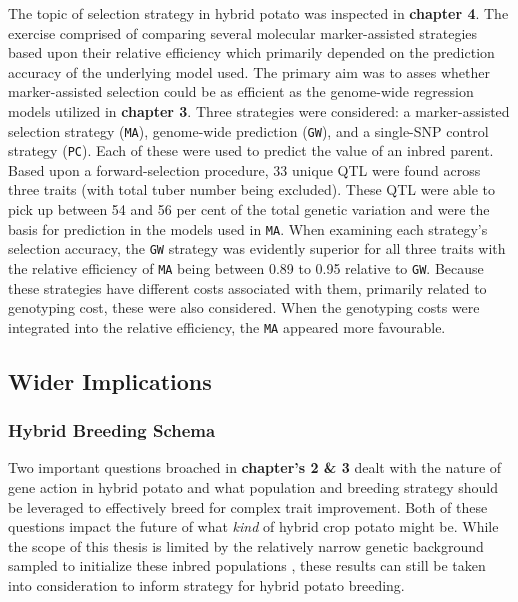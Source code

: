 \documentclass[
]{article}
\begin{document}
The topic of selection strategy in hybrid potato was inspected in
\textbf{chapter 4}. The exercise comprised of comparing several
molecular marker-assisted strategies based upon their relative
efficiency which primarily depended on the prediction accuracy of the
underlying model used. The primary aim was to asses whether
marker-assisted selection could be as efficient as the genome-wide
regression models utilized in \textbf{chapter 3}. Three strategies were
considered: a marker-assisted selection strategy (\texttt{MA}),
genome-wide prediction (\texttt{GW}), and a single-SNP control strategy
(\texttt{PC}). Each of these were used to predict the value of an inbred
parent. Based upon a forward-selection procedure, 33 unique QTL were
found across three traits (with total tuber number being excluded).
These QTL were able to pick up between 54 and 56 per cent of the total
genetic variation and were the basis for prediction in the models used
in \texttt{MA}. When examining each strategy's selection accuracy, the
\texttt{GW} strategy was evidently superior for all three traits with
the relative efficiency of \texttt{MA} being between 0.89 to 0.95
relative to \texttt{GW}. Because these strategies have different costs
associated with them, primarily related to genotyping cost, these were
also considered. When the genotyping costs were integrated into the
relative efficiency, the \texttt{MA} appeared more favourable.

\subsection{Wider Implications}\label{wider-implications}

\subsubsection{Hybrid Breeding Schema}\label{hybrid-breeding-schema}

Two important questions broached in \textbf{chapter's 2 \& 3} dealt with
the nature of gene action in hybrid potato and what population and
breeding strategy should be leveraged to effectively breed for complex
trait improvement. Both of these questions impact the future of what
\emph{kind} of hybrid crop potato might be. While the scope of this
thesis is limited by the relatively narrow genetic background sampled to
initialize these inbred populations \autocite{Lindhout2018}, these
results can still be taken into consideration to inform strategy for
hybrid potato breeding.
\end{document}
